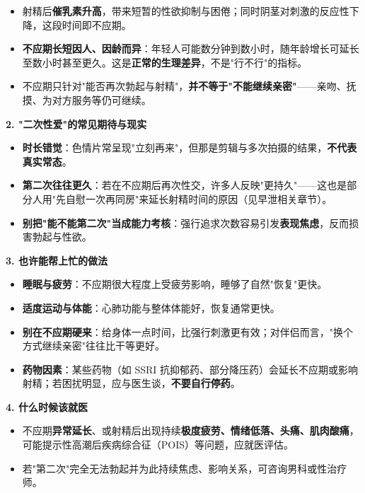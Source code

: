 \begin{itemize}
	\item 射精后\textbf{催乳素升高}，带来短暂的性欲抑制与困倦；同时阴茎对刺激的反应性下降，这段时间即不应期。
	\item \textbf{不应期长短因人、因龄而异}：年轻人可能数分钟到数小时，随年龄增长可延长至数小时甚至更久。这是\textbf{正常的生理差异}，不是"行不行"的指标。
	\item 不应期只针对"能否再次勃起与射精"，\textbf{并不等于"不能继续亲密"}——亲吻、抚摸、为对方服务等仍可继续。
\end{itemize}

\noindent\textbf{2. "二次性爱"的常见期待与现实}

\begin{itemize}
	\item \textbf{时长错觉}：色情片常呈现"立刻再来"，但那是剪辑与多次拍摄的结果，\textbf{不代表真实常态}。
	\item \textbf{第二次往往更久}：若在不应期后再次性交，许多人反映"更持久"——这也是部分人用"先自慰一次再同房"来延长射精时间的原因（见早泄相关章节）。
	\item \textbf{别把"能不能第二次"当成能力考核}：强行追求次数容易引发\textbf{表现焦虑}，反而损害勃起与性欲。
\end{itemize}

\noindent\textbf{3. 也许能帮上忙的做法}

\begin{itemize}
	\item \textbf{睡眠与疲劳}：不应期很大程度上受疲劳影响，睡够了自然"恢复"更快。
	\item \textbf{适度运动与体能}：心肺功能与整体体能好，恢复通常更快。
	\item \textbf{别在不应期硬来}：给身体一点时间，比强行刺激更有效；对伴侣而言，"换个方式继续亲密"往往比干等更好。
	\item \textbf{药物因素}：某些药物（如 SSRI 抗抑郁药、部分降压药）会延长不应期或影响射精；若困扰明显，应与医生谈，\textbf{不要自行停药}。
\end{itemize}

\noindent\textbf{4. 什么时候该就医}

\begin{itemize}
	\item 不应期\textbf{异常延长}、或射精后出现持续\textbf{极度疲劳、情绪低落、头痛、肌肉酸痛}，可能提示性高潮后疾病综合征（POIS）等问题，应就医评估。
	\item 若"第二次"完全无法勃起并为此持续焦虑、影响关系，可咨询男科或性治疗师。
\end{itemize}

